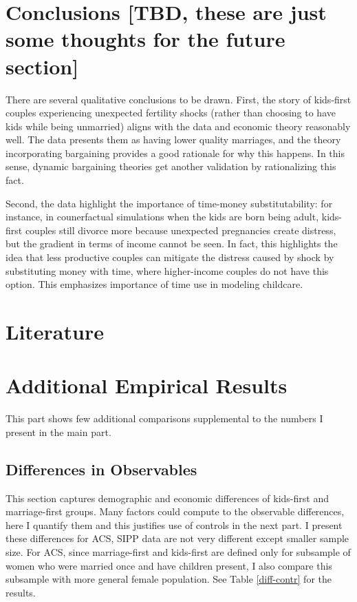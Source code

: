 \documentclass[12pt,letter]{article}
\begin{document}
\section{Conclusions [TBD, these are just some thoughts for the future section]}
There are several qualitative conclusions to be drawn. First, the story of kids-first couples experiencing unexpected fertility shocks (rather than choosing to have kids while being unmarried) aligns with the data and economic theory reasonably well. The data presents them as having lower quality marriages, and the theory incorporating bargaining provides a good rationale for why this happens. In this sense, dynamic bargaining theories get another validation by rationalizing this fact.

Second, the data highlight the importance of time-money substitutability: for instance, in counerfactual simulations when the kids are born being adult, kids-first couples still divorce more because unexpected pregnancies create distress, but the gradient in terms of income cannot be seen. In fact, this highlights the idea that less productive couples can mitigate the distress caused by shock by substituting money with time, where higher-income couples do not have this option. This emphasizes importance of time use in modeling childcare.
\clearpage

\section*{Literature}
%



\newpage
\appendix
\section{Additional Empirical Results\label{extra-comparisons}}
This part shows few additional comparisons supplemental to the numbers I present in the main part.

\subsection{Differences in Observables\label{comp-diff-appendix}}
This section captures demographic and economic differences of kids-first and marriage-first groups. Many factors could compute to the observable differences, here I quantify them and this justifies use of controls in the next part. I present these differences for ACS, SIPP data are not very different except smaller sample size. For ACS, since marriage-first and kids-first are defined only for subsample of women who were married once and have children present, I also compare this subsample with more general female population. See Table \ref{diff-contr} for the results.
\end{document}
